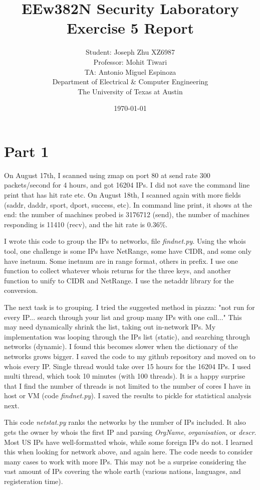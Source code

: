 \documentclass[11pt]{article}
\author{Student: Joseph Zhu XZ6987 \\ Professor: Mohit Tiwari \\ TA: Antonio Miguel Espinoza \\ Department of Electrical \& Computer Engineering \\ The University of Texas at Austin}
\date{\today}
\title{EEw382N Security Laboratory Exercise 5 Report}
\begin{document}
\maketitle

\section{Part 1}
\label{sec:part-1}

On August 17th, I scanned using zmap on port 80 at send rate 300 packets/second
for 4 hours, and got 16204 IPs.
I did not save the command line print that has hit rate etc.
On August 18th, I scanned again with more fields (saddr, daddr, sport, dport,
success, etc). In command line print, it shows at the end:
the number of machines probed is 3176712 (send),
the number of machines responding is 11410 (recv),
and the hit rate is 0.36\%.

I wrote this code to group the IPs to networks, file \textit{findnet.py}.
Using the whois tool, one challenge is some IPs have NetRange, some have CIDR,
and some only have inetnum. Some inetnum are in range format, others in prefix.
I use one function to collect whatever whois returns for the three keys,
and another function to unify to CIDR and NetRange.
I use the netaddr library for the conversion.

The next task is to grouping. I tried the suggested method in piazza:
"not run for every IP... search through your list and group many IPs with one call..."
This may need dynamically shrink the list, taking out in-network IPs.
My implementation was looping through the IPs list (static), and searching
through networks (dynamic). I found this becomes slower when the dictionary
of the networks grows bigger.
I saved the code to my github repository and moved on to whois every IP.
Single thread would take over 15 hours for the 16204 IPs.
I used multi thread, which took 10 minutes (with 100 threads).
It is a happy surprise that I find the number of threads is not limited
to the number of cores I have in host or VM (code \textit{findnet.py}).
I saved the results to pickle for statistical analysis next.

This code \textit{netstat.py} ranks the networks by the number of IPs included.
It also gets the owner by whois the first IP and parsing \textit{OrgName},
\textit{organisation}, or \textit{descr}.
Most US IPs have well-formatted whois, while some foreign IPs do not.
I learned this when looking for network above, and again here.
The code needs to consider many cases to work with more IPs.
This may not be a surprise considering the vast amount of IPs covering
the whole earth (various nations, languages, and registeration time).
\end{document}

